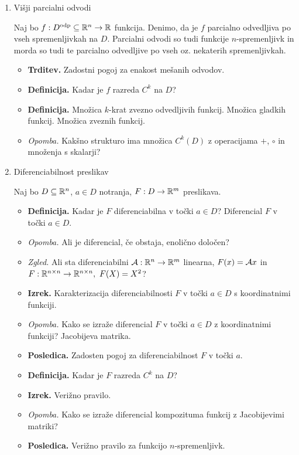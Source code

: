 \begin{enumerate}
    \item Višji parcialni odvodi
    
    Naj bo $f: D^\text{odp} \subseteq \mathbb{R}^n \to \mathbb{R}$ funkcija. Denimo, da je $f$ parcialno odvedljiva po vseh spremenljivkah na $D$. Parcialni odvodi so tudi funkcije $n$-spremenljivk in morda so tudi te parcialno odvedljive po vseh oz. nekaterih spremenljivkah.
    
    \begin{itemize}
        \item \colorbox{blue!30}{\textbf{Trditev.}} Zadostni pogoj za enakost mešanih odvodov.
        \item \colorbox{purple!30}{\textbf{Definicija.}} Kadar je $f$ razreda $C^k$ na $D$?
        \item \colorbox{purple!30}{\textbf{Definicija.}}  Množica $k$-krat zvezno odvedljivih funkcij. Množica gladkih funkcij. Množica zveznih funkcij.
        \item \colorbox{yellow!30}{\emph{Opomba.}} Kakšno strukturo ima množica $C^k(D)$ z operacijama $+$, $\circ$ in množenja s skalarji?
    \end{itemize}

    \item Diferenciabilnost preslikav
    
    Naj bo $D \subseteq \mathbb{R}^n$, $a \in D$ notranja, $F: D \to \mathbb{R}^m$ preslikava.
    \begin{itemize}
        \item \colorbox{purple!30}{\textbf{Definicija.}} Kadar je $F$ diferenciabilna v točki $a \in D$? Diferencial $F$ v točki $a \in D$.
        \item \colorbox{yellow!30}{\emph{Opomba.}} Ali je diferencial, če obstaja, enolično določen?
        \item \colorbox{yellow!30}{\emph{Zgled.}} Ali sta diferenciabilni $\mathcal{A}: \mathbb{R}^n \to \mathbb{R}^m$ linearna, $F(x) = \mathcal{A}x$ in $F: 
        \mathbb{R}^{n \times n} \to \mathbb{R}^{n \times n}, \ F(X) = X^2$?
        \item \colorbox{blue!30}{\textbf{Izrek.}} Karakterizacija diferenciabilnosti $F$ v točki $a \in D$ s koordinatnimi funkciji. 
        \item \colorbox{yellow!30}{\emph{Opomba.}} Kako se izraže diferencial $F$ v točki $a \in D$ z koordinatnimi funkciji? Jacobijeva matrika.
        \item \colorbox{orange!30}{\textbf{Posledica.}} Zadosten pogoj za diferenciabilnost $F$ v točki $a$.
        \item \colorbox{purple!30}{\textbf{Definicija.}} Kadar je $F$ razreda $C^k$ na $D$?
        \item \colorbox{blue!30}{\textbf{Izrek.}} Verižno pravilo.
        \item \colorbox{yellow!30}{\emph{Opomba.}} Kako se izraže diferencial kompozituma funkcij z Jacobijevimi matriki?
        \item \colorbox{orange!30}{\textbf{Posledica.}} Verižno pravilo za funkcijo $n$-spremenljivk.
    \end{itemize}
\end{enumerate}

